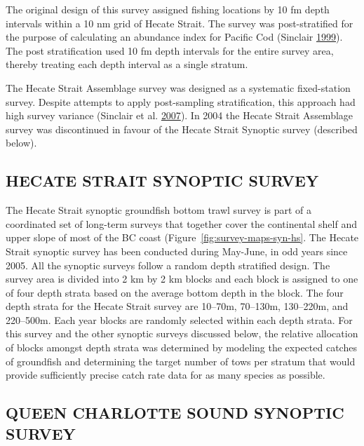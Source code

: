 \documentclass[11pt]{book}
\begin{document}
The original design of this survey assigned fishing locations by 10 fm depth intervals within a 10 nm grid of Hecate Strait. The survey was post-stratified for the purpose of calculating an abundance index for Pacific Cod (Sinclair \protect\hyperlink{ref-sinclair2000}{1999}). The post stratification used 10 fm depth intervals for the entire survey area, thereby treating each depth interval as a single stratum.

The Hecate Strait Assemblage survey was designed as a systematic fixed-station survey. Despite attempts to apply post-sampling stratification, this approach had high survey variance (Sinclair et al. \protect\hyperlink{ref-sinclair2007}{2007}). In 2004 the Hecate Strait Assemblage survey was discontinued in favour of the Hecate Strait Synoptic survey (described below).

\hypertarget{hecate-strait-synoptic-survey}{%
\subsection{HECATE STRAIT SYNOPTIC SURVEY}\label{hecate-strait-synoptic-survey}}

The Hecate Strait synoptic groundfish bottom trawl survey is part of a coordinated set of long-term surveys that together cover the continental shelf and upper slope of most of the BC coast (Figure~\ref{fig:survey-maps-syn-hs}. The Hecate Strait synoptic survey has been conducted during May-June, in odd years since 2005. All the synoptic surveys follow a random depth stratified design. The survey area is divided into 2 km by 2 km blocks and each block is assigned to one of four depth strata based on the average bottom depth in the block. The four depth strata for the Hecate Strait survey are 10--70m, 70--130m, 130--220m, and 220--500m. Each year blocks are randomly selected within each depth strata. For this survey and the other synoptic surveys discussed below, the relative allocation of blocks amongst depth strata was determined by modeling the expected catches of groundfish and determining the target number of tows per stratum that would provide sufficiently precise catch rate data for as many species as possible.

\hypertarget{queen-charlotte-sound-synoptic-survey}{%
\subsection{QUEEN CHARLOTTE SOUND SYNOPTIC SURVEY}\label{queen-charlotte-sound-synoptic-survey}}
\end{document}
